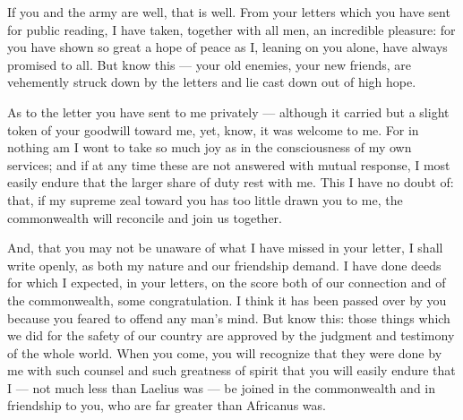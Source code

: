 

 If you and the army are well, that is well. From your letters which you have sent for public reading, I have taken, together with all men, an incredible pleasure: for you have shown so great a hope of peace as I, leaning on you alone, have always promised to all. But know this --- your old enemies, your new friends, are vehemently struck down by the letters and lie cast down out of high hope.

 As to the letter you have sent to me privately --- although it carried but a slight token of your goodwill toward me, yet, know, it was welcome to me. For in nothing am I wont to take so much joy as in the consciousness of my own services; and if at any time these are not answered with mutual response, I most easily endure that the larger share of duty rest with me. This I have no doubt of: that, if my supreme zeal toward you has too little drawn you to me, the commonwealth will reconcile and join us together.

 And, that you may not be unaware of what I have missed in your letter, I shall write openly, as both my nature and our friendship demand. I have done deeds for which I expected, in your letters, on the score both of our connection and of the commonwealth, some congratulation. I think it has been passed over by you because you feared to offend any man's mind. But know this: those things which we did for the safety of our country are approved by the judgment and testimony of the whole world. When you come, you will recognize that they were done by me with such counsel and such greatness of spirit that you will easily endure that I --- not much less than Laelius was --- be joined in the commonwealth and in friendship to you, who are far greater than Africanus was.
